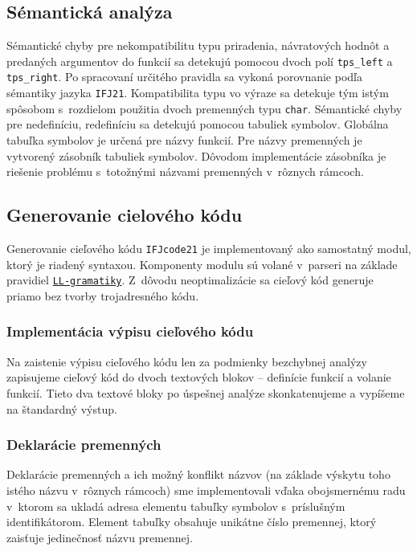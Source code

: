 \documentclass[a4paper, 11pt]{article}
\begin{document}
    \subsection{Sémantická analýza}

    Sémantické chyby pre nekompatibilitu typu priradenia, návratových hodnôt a predaných
    argumentov do funkcií sa detekujú pomocou dvoch polí \texttt{tps\_left} a \texttt{tps\_right}. Po spracovaní
    určitého pravidla sa vykoná porovnanie podľa sémantiky jazyka \texttt{IFJ21}.
    Kompatibilita typu vo výraze sa detekuje tým istým spôsobom s~rozdielom použitia dvoch premenných typu \texttt{char}.
    Sémantické chyby pre nedefiníciu, redefiníciu sa detekujú pomocou tabuliek symbolov. Globálna tabuľka
    symbolov je určená pre názvy funkcií. Pre názvy premenných je vytvorený zásobník
    tabuliek symbolov. Dôvodom implementácie zásobníka je riešenie problému s~totožnými názvami premenných
    v~rôznych rámcoch.



    \subsection{Generovanie cielového kódu}
    Generovanie cieľového kódu \texttt{IFJcode21} je implementovaný ako samostatný modul, ktorý je riadený syntaxou.
    Komponenty modulu sú volané v~parseri na základe pravidiel \hyperref[sec: LL-gramatika]{\texttt{LL-gramatiky}}. Z~dôvodu neoptimalizácie sa cieľový kód
    generuje priamo bez tvorby trojadresného kódu.

    \subsubsection{Implementácia výpisu cieľového kódu}
    Na zaistenie výpisu cieľového kódu len za podmienky bezchybnej analýzy zapisujeme cieľový kód do dvoch textových
    blokov -- definície funkcií a volanie funkcií. Tieto dva textové bloky po úspešnej analýze skonkatenujeme a
    vypíšeme na štandardný výstup.

    \subsubsection{Deklarácie premenných}
    Deklarácie premenných a ich možný konflikt názvov (na základe výskytu toho istého názvu v~rôznych rámcoch)
    sme implementovali vďaka obojsmernému radu v~ktorom sa ukladá adresa elementu tabuľky
    symbolov s~príslušným identifikátorom. Element tabuľky obsahuje unikátne číslo premennej, ktorý zaisťuje jedinečnosť
    názvu premennej.
\end{document}
